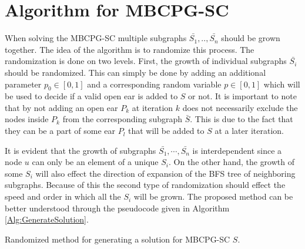 \section{Algorithm for MBCPG-SC}

When solving the MBCPG-SC multiple subgraphs $\bar{S_1}, .., \bar{S_n}$ should be grown together. The idea of the algorithm is to randomize this process. The randomization is done on two levels. First,  the growth of individual subgraphs $\bar{S_i}$ should be randomized. This can simply be done by adding an additional parameter $p_0 \in [0,1]$  and a corresponding random variable $p\in [0,1]$ which will be used to decide if a valid open ear is added to $S$ or not. It is important to note that by not adding an open ear $P_k$ at iteration $k$  does not necessarily exclude the nodes inside $P_k$ from the corresponding subgraph $\bar{S}$. This is due to the fact that they can be a part of some ear $P_l$ that will be added to $S$ at a later iteration. 

It is evident that the growth of subgraphs $\bar{S_1}, \cdots , \bar{S_n}$ is interdependent since a  node $u$ can only be an element of a unique $S_i$. On the other hand, the growth of some $S_i$ will also effect the direction of expansion of the BFS tree of neighboring subgraphs. Because of this the second type of randomization should effect the speed and order in which all the $S_i$ will be grown. The proposed method can be better understood through the pseudocode given in Algorithm \ref{Alg:GenerateSolution}.
\begin{algorithm}
\begin{algorithmic}
\Repeat
{}
\EndWhile
\EndProcedure
\end{algorithmic}
\caption{\label{Alg:GenerateSolution} Randomized method for generating a solution for MBCPG-SC $S$.}
\end{algorithm}


